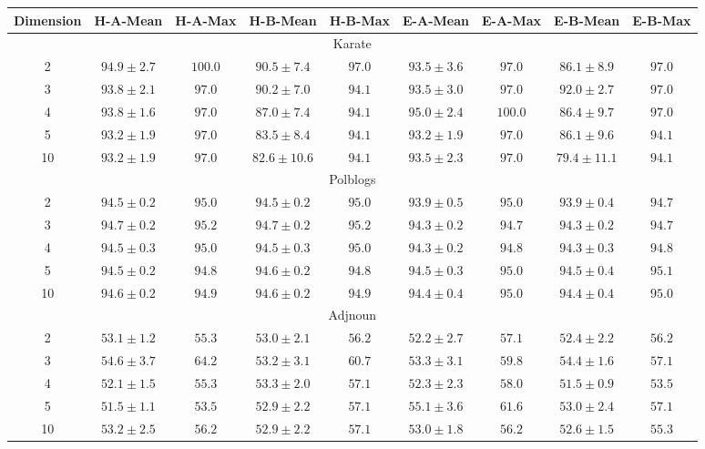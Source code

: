 \documentclass{article}
\begin{document}
\begin{table} 
    \centering 
    \begin{tabular}{|c|cccc|cccc|}
        \hline Dimension & H-A-Mean & H-A-Max & H-B-Mean & H-B-Max & E-A-Mean & E-A-Max & E-B-Mean & E-B-Max\\ \hline
        
        \hline
        \multicolumn{9}{|c|}{Karate} \\ 
        \hline
        2&$94.9 \pm 2.7$&$100.0$&$90.5 \pm 7.4$&$97.0$&$93.5 \pm 3.6$&$97.0$&$86.1 \pm8.9$&$97.0$\\ \hline
        3&$93.8 \pm 2.1$&$97.0$&$90.2 \pm 7.0$&$94.1$&$93.5 \pm 3.0$&$97.0$&$92.0 \pm2.7$&$97.0$\\ \hline
        4&$93.8 \pm 1.6$&$97.0$&$87.0 \pm 7.4$&$94.1$&$95.0 \pm 2.4$&$100.0$&$86.4 \pm9.7$&$97.0$\\ \hline
        5&$93.2 \pm 1.9$&$97.0$&$83.5 \pm 8.4$&$94.1$&$93.2 \pm 1.9$&$97.0$&$86.1 \pm9.6$&$94.1$\\ \hline
        10&$93.2 \pm 1.9$&$97.0$&$82.6 \pm 10.6$&$94.1$&$93.5 \pm 2.3$&$97.0$&$79.4 \pm11.1$&$94.1$\\ \hline
        
        \hline
        \multicolumn{9}{|c|}{Polblogs} \\ 
        \hline
		2&$94.5 \pm 0.2$&$95.0$&$94.5 \pm 0.2$&$95.0$&$93.9 \pm 0.5$&$95.0$&$93.9 \pm0.4$&$94.7$\\ \hline
		3&$94.7 \pm 0.2$&$95.2$&$94.7 \pm 0.2$&$95.2$&$94.3 \pm 0.2$&$94.7$&$94.3 \pm0.2$&$94.7$\\ \hline
		4&$94.5 \pm 0.3$&$95.0$&$94.5 \pm 0.3$&$95.0$&$94.3 \pm 0.2$&$94.8$&$94.3 \pm0.3$&$94.8$\\ \hline
		5&$94.5 \pm 0.2$&$94.8$&$94.6 \pm 0.2$&$94.8$&$94.5 \pm 0.3$&$95.0$&$94.5 \pm0.4$&$95.1$\\ \hline
		10&$94.6 \pm 0.2$&$94.9$&$94.6 \pm 0.2$&$94.9$&$94.4 \pm 0.4$&$95.0$&$94.4 \pm0.4$&$95.0$\\ \hline

        \hline
        \multicolumn{9}{|c|}{Adjnoun} \\
        \hline
        2&$53.1 \pm 1.2$&$55.3$&$53.0 \pm 2.1$&$56.2$&$52.2 \pm 2.7$&$57.1$&$52.4 \pm2.2$&$56.2$\\ \hline
		3&$54.6 \pm 3.7$&$64.2$&$53.2 \pm 3.1$&$60.7$&$53.3 \pm 3.1$&$59.8$&$54.4 \pm1.6$&$57.1$\\ \hline
		4&$52.1 \pm 1.5$&$55.3$&$53.3 \pm 2.0$&$57.1$&$52.3 \pm 2.3$&$58.0$&$51.5 \pm0.9$&$53.5$\\ \hline
		5&$51.5 \pm 1.1$&$53.5$&$52.9 \pm 2.2$&$57.1$&$55.1 \pm 3.6$&$61.6$&$53.0 \pm2.4$&$57.1$\\ \hline
        10&$53.2 \pm 2.5$&$56.2$&$52.9 \pm 2.2$&$57.1$&$53.0 \pm 1.8$&$56.2$&$52.6 \pm1.5$&$55.3$\\ \hline
        

\end{tabular}
\end{table}
\end{document}
